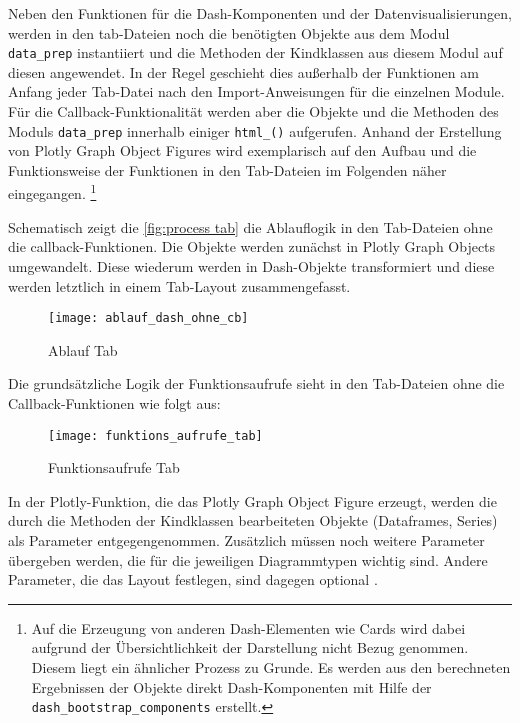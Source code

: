     Neben den Funktionen für die Dash-Komponenten und der Datenvisualisierungen, werden in den tab-Dateien noch die benötigten Objekte aus dem Modul \texttt{data\_prep} 
    instantiiert und die Methoden der Kindklassen aus diesem Modul auf diesen angewendet. In der Regel geschieht dies außerhalb der Funktionen am Anfang 
    jeder Tab-Datei nach den Import-Anweisungen für die einzelnen Module. Für die Callback-Funktionalität werden aber die Objekte und die Methoden des Moduls \texttt{data\_prep} innerhalb einiger \texttt{html\_()} aufgerufen.
    Anhand der Erstellung von Plotly Graph Object Figures wird exemplarisch auf den Aufbau und die Funktionsweise der Funktionen in den Tab-Dateien im Folgenden näher eingegangen.
    \footnote{Auf die Erzeugung von anderen Dash-Elementen wie Cards wird dabei aufgrund der Übersichtlichkeit der Darstellung nicht Bezug genommen. Diesem liegt ein ähnlicher Prozess
    zu Grunde. Es werden aus den berechneten Ergebnissen der Objekte direkt Dash-Komponenten mit Hilfe der \texttt{dash\_bootstrap\_components} erstellt.}
    
    Schematisch zeigt die \autoref{fig:process tab} die Ablauflogik in den Tab-Dateien ohne die callback-Funktionen.
    Die Objekte werden zunächst in Plotly Graph Objects umgewandelt. Diese wiederum werden in Dash-Objekte transformiert und diese werden 
    letztlich in einem Tab-Layout zusammengefasst.
    
    \begin{figure}[H]
        \centering
            \texttt{[image: ablauf\_dash\_ohne\_cb]}
            \caption{Ablauf Tab}
            \label{fig:process tab}
    \end{figure}

    Die grundsätzliche Logik der Funktionsaufrufe sieht in den Tab-Dateien ohne die Callback-Funktionen wie folgt aus:


    \begin{figure}[H]
        \centering
            \texttt{[image: funktions\_aufrufe\_tab]}
            \caption{Funktionsaufrufe Tab}
            \label{fig:function call tab}
    \end{figure}

    In der Plotly-Funktion, die das Plotly Graph Object Figure erzeugt, werden die durch die Methoden der Kindklassen bearbeiteten Objekte (Dataframes, Series) 
    als Parameter entgegengenommen. Zusätzlich müssen noch weitere Parameter übergeben werden, die für die jeweiligen Diagrammtypen wichtig sind.
    Andere Parameter, die das Layout festlegen, sind dagegen optional \cite[vgl.][]{plotly_plotlygraph_objectsbar_2021}.
    
